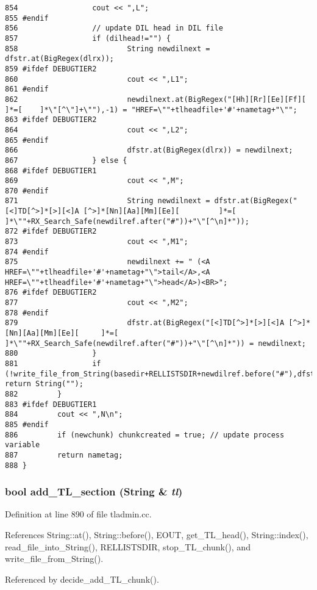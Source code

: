\begin{verbatim}
854                 cout << ",L";
855 #endif
856                 // update DIL head in DIL file
857                 if (dilhead!="") {
858                         String newdilnext = dfstr.at(BigRegex(dlrx)); 
859 #ifdef DEBUGTIER2
860                         cout << ",L1";
861 #endif
862                         newdilnext.at(BigRegex("[Hh][Rr][Ee][Ff][       ]*=[    ]*\"[^\"]+\""),-1) = "HREF=\""+tlheadfile+'#'+nametag+"\"";
863 #ifdef DEBUGTIER2
864                         cout << ",L2";
865 #endif
866                         dfstr.at(BigRegex(dlrx)) = newdilnext;
867                 } else {
868 #ifdef DEBUGTIER1
869                         cout << ",M";
870 #endif
871                         String newdilnext = dfstr.at(BigRegex("[<]TD[^>]*[>][<]A [^>]*[Nn][Aa][Mm][Ee][         ]*=[    ]*\""+RX_Search_Safe(newdilref.after("#"))+"\"[^\n]*"));
872 #ifdef DEBUGTIER2
873                         cout << ",M1";
874 #endif
875                         newdilnext += " (<A HREF=\""+tlheadfile+'#'+nametag+"\">tail</A>,<A HREF=\""+tlheadfile+'#'+nametag+"\">head</A>)<BR>";
876 #ifdef DEBUGTIER2
877                         cout << ",M2";
878 #endif
879                         dfstr.at(BigRegex("[<]TD[^>]*[>][<]A [^>]*[Nn][Aa][Mm][Ee][     ]*=[    ]*\""+RX_Search_Safe(newdilref.after("#"))+"\"[^\n]*")) = newdilnext;
880                 }
881                 if (!write_file_from_String(basedir+RELLISTSDIR+newdilref.before("#"),dfstr,"DIL")) return String("");
882         }
883 #ifdef DEBUGTIER1
884         cout << ",N\n";
885 #endif
886         if (newchunk) chunkcreated = true; // update process variable
887         return nametag;
888 }
\end{verbatim}\normalsize 
{}
\subsubsection{\setlength{\rightskip}{0pt plus 5cm}bool add\_\-TL\_\-section ({\bf String} \& {\em tl})}\label{tladmin_8cc_a10}




Definition at line 890 of file tladmin.cc.

References String::at(), String::before(), EOUT, get\_\-TL\_\-head(), String::index(), read\_\-file\_\-into\_\-String(), RELLISTSDIR, stop\_\-TL\_\-chunk(), and write\_\-file\_\-from\_\-String().

Referenced by decide\_\-add\_\-TL\_\-chunk().



